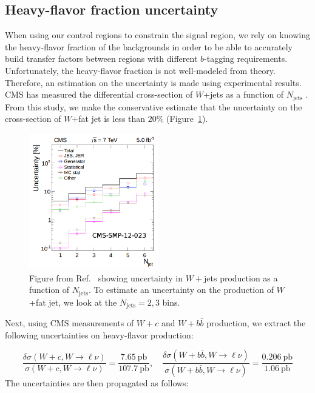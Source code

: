 \subsection{Heavy-flavor fraction uncertainty}\label{sec:hffrac}
When using our control regions to constrain the signal region, we rely on knowing the heavy-flavor fraction of the backgrounds in order to be able to accurately build transfer factors between regions with different $b$-tagging requirements.
Unfortunately, the heavy-flavor fraction is not well-modeled from theory.
Therefore, an estimation on the uncertainty is made using experimental results.
CMS has measured the differential cross-section of $W$+jets as a function of $N_\text{jets}$ \cite{CMS-PAS-SMP-12-023}. 
From this study, we make the conservative estimate that the uncertainty on the cross-section of $W$+fat jet is less than $20\%$ (Figure~\ref{fig:wnjets}). 

\begin{figure}[htbp]
  \centering
  \includegraphics[width=0.5\textwidth]{figures/wnjets.png}
  \caption{Figure from Ref.~\cite{CMS-PAS-SMP-12-023} showing uncertainty in $W+$jets production as a function of $N_\text{jets}$. To estimate an uncertainty on the production of $W$+fat jet, we look at the $N_\text{jets}=2,3$ bins.}
  \label{fig:wnjets}
\end{figure}

Next, using CMS measurements of $W+c$ \cite{CMS-PAS-SMP-13-149} and $W+b\bar{b}$ \cite{CMS-PAS-SMP-12-026} production, we extract the following uncertainties on heavy-flavor production:

\begin{equation}
  \frac{\delta\sigma(W+c, W\rightarrow \ell\nu)}{\sigma(W+c, W\rightarrow \ell\nu)} = \frac{7.65~\text{pb}}{107.7~\text{pb}}, \quad \frac{\delta\sigma(W+b\bar{b}, W\rightarrow \ell\nu)}{\sigma(W+b\bar{b}, W\rightarrow \ell\nu)} = \frac{0.206~\text{pb}}{1.06~\text{pb}}
\end{equation}
The uncertainties are then propagated as follows:

